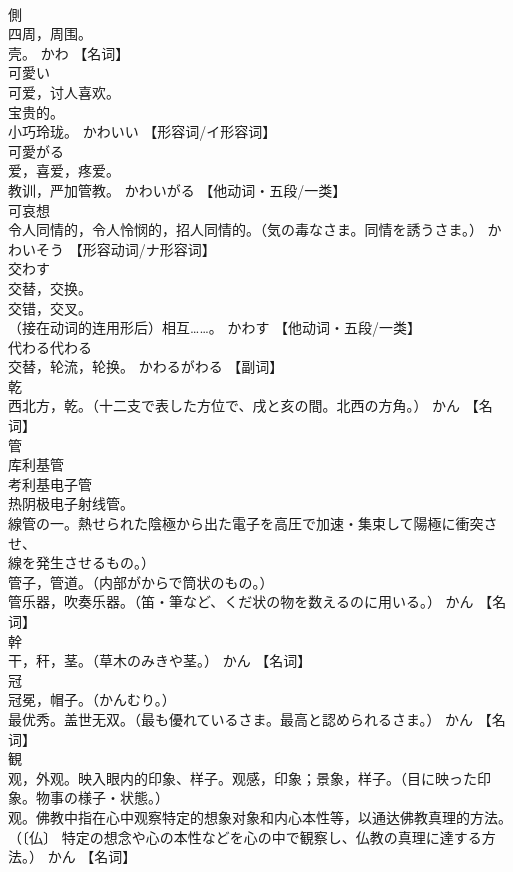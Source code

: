\documentclass[8pt]{extreport}
\begin{document}
\begin{CJK}{UTF8}{min}
\\	側	
\\	四周，周围。 
\\	壳。	かわ		【名词】
\\	可愛い	
\\	可爱，讨人喜欢。 
\\	宝贵的。 
\\	小巧玲珑。	かわいい		【形容词/イ形容词】
\\	可愛がる	
\\	爱，喜爱，疼爱。 
\\	教训，严加管教。	かわいがる		【他动词・五段/一类】
\\	可哀想	
\\	令人同情的，令人怜悯的，招人同情的。（気の毒なさま。同情を誘うさま。）	かわいそう		【形容动词/ナ形容词】
\\	交わす	
\\	交替，交换。 
\\	交错，交叉。 
\\	（接在动词的连用形后）相互……。	かわす		【他动词・五段/一类】
\\	代わる代わる	
\\	交替，轮流，轮换。	かわるがわる		【副词】
\\	乾	
\\	西北方，乾。（十二支で表した方位で、戌と亥の間。北西の方角。）	かん		【名词】
\\	管	
\\	库利基管
\\	考利基电子管
\\	热阴极电子射线管。
\\	線管の一。熱せられた陰極から出た電子を高圧で加速・集束して陽極に衝突させ、
\\	線を発生させるもの。） 
\\	管子，管道。（内部がからで筒状のもの。） 
\\	管乐器，吹奏乐器。（笛・筆など、くだ状の物を数えるのに用いる。）	かん		【名词】
\\	幹	
\\	干，秆，茎。（草木のみきや茎。）	かん		【名词】
\\	冠	
\\	冠冕，帽子。（かんむり。） 
\\	最优秀。盖世无双。（最も優れているさま。最高と認められるさま。）	かん		【名词】
\\	観	
\\	观，外观。映入眼内的印象、样子。观感，印象；景象，样子。（目に映った印象。物事の様子・状態。） 
\\	观。佛教中指在心中观察特定的想象对象和内心本性等，以通达佛教真理的方法。（〔仏〕 特定の想念や心の本性などを心の中で観察し、仏教の真理に達する方法。）	かん		【名词】

\end{CJK}
\end{document}
